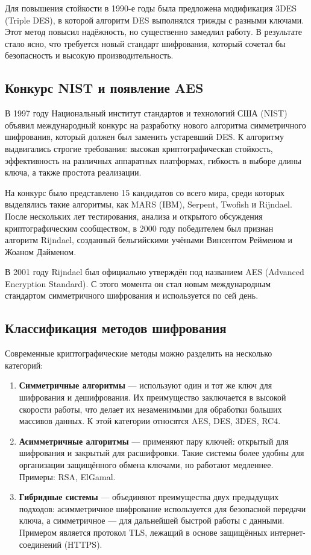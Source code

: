 Для повышения стойкости в 1990-е годы была предложена модификация 3DES (Triple DES), в которой алгоритм DES выполнялся трижды с разными ключами. Этот метод повысил надёжность, но существенно замедлил работу. В результате стало ясно, что требуется новый стандарт шифрования, который сочетал бы безопасность и высокую производительность.  

\subsection{Конкурс NIST и появление AES}

В 1997 году Национальный институт стандартов и технологий США (NIST) объявил международный конкурс на разработку нового алгоритма симметричного шифрования, который должен был заменить устаревший DES. К алгоритму выдвигались строгие требования: высокая криптографическая стойкость, эффективность на различных аппаратных платформах, гибкость в выборе длины ключа, а также простота реализации.  

На конкурс было представлено 15 кандидатов со всего мира, среди которых выделялись такие алгоритмы, как MARS (IBM), Serpent, Twofish и Rijndael. После нескольких лет тестирования, анализа и открытого обсуждения криптографическим сообществом, в 2000 году победителем был признан алгоритм Rijndael, созданный бельгийскими учёными Винсентом Рейменом и Жоаном Дайменом.  

В 2001 году Rijndael был официально утверждён под названием AES (Advanced Encryption Standard). С этого момента он стал новым международным стандартом симметричного шифрования и используется по сей день.  

\subsection{Классификация методов шифрования}

Современные криптографические методы можно разделить на несколько категорий:  

\begin{enumerate}
	\item \textbf{Симметричные алгоритмы} — используют один и тот же ключ для шифрования и дешифрования. Их преимущество заключается в высокой скорости работы, что делает их незаменимыми для обработки больших массивов данных. К этой категории относятся AES, DES, 3DES, RC4.  
	\item \textbf{Асимметричные алгоритмы} — применяют пару ключей: открытый для шифрования и закрытый для расшифровки. Такие системы более удобны для организации защищённого обмена ключами, но работают медленнее. Примеры: RSA, ElGamal.  
	\item \textbf{Гибридные системы} — объединяют преимущества двух предыдущих подходов: асимметричное шифрование используется для безопасной передачи ключа, а симметричное — для дальнейшей быстрой работы с данными. Примером является протокол TLS, лежащий в основе защищённых интернет-соединений (HTTPS).  
\end{enumerate}

